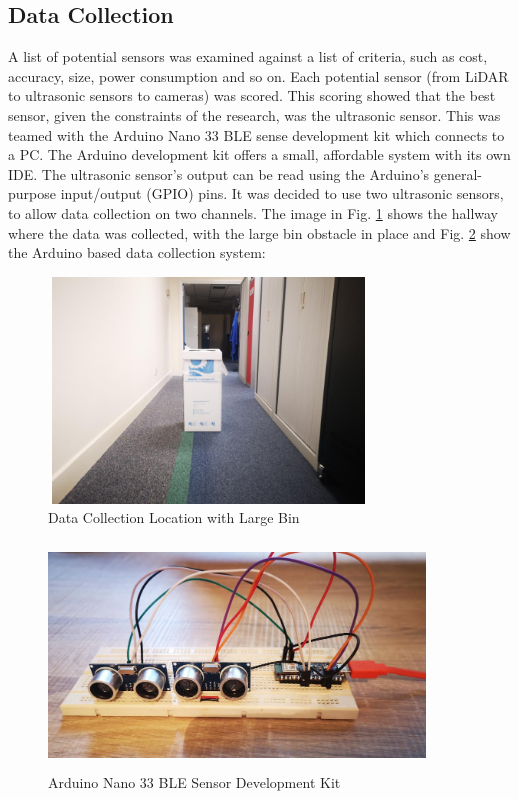 \documentclass{svproc}
\begin{document}
\subsection{Data Collection}
A list of potential sensors was examined against a list of criteria, such as cost, accuracy, size, power consumption and so on. Each potential sensor (from LiDAR to ultrasonic 
sensors to cameras) was scored. This scoring showed that the best sensor, given the constraints of the research, 
was the ultrasonic sensor. This was teamed with the Arduino Nano 33 BLE sense development kit which connects to a PC. 
The Arduino development kit offers a small, affordable system with its own IDE. The ultrasonic sensor's output can be read using the 
Arduino's general-purpose input/output (GPIO) pins. It was decided to use two ultrasonic sensors, to allow data collection on two channels. 
The image in Fig. \ref{fig:collection1} shows the hallway where the data was collected, with the large bin obstacle in place 
and Fig. \ref{fig:collection2} show the Arduino based data collection system:    
\begin{figure}[ht]
\includegraphics[width=8.5cm, height=6cm]{images/hallway1.png}
\centering
\caption{Data Collection Location with Large Bin}
\label{fig:collection1}
\end{figure}

\begin{figure}[ht]
\includegraphics[width=10cm, height=6cm]{images/data_collection_system.png}
\centering
\caption{Arduino Nano 33 BLE Sensor Development Kit}
\label{fig:collection2}
\end{figure}
\end{document}
